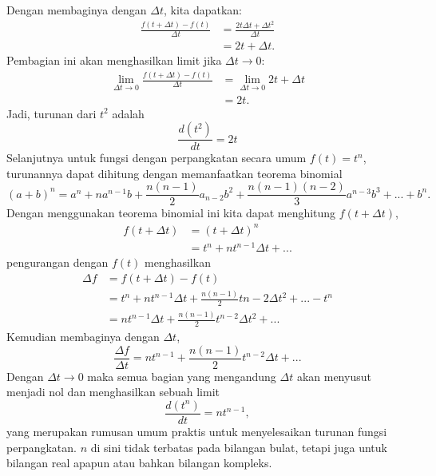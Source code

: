 Dengan membaginya dengan $\Delta t$, kita dapatkan:
\begin{align*}
\frac{f(t + \Delta t)-f(t)}{\Delta t}&=\frac{2t\Delta t + \Delta t^2}{\Delta t}\\
&=2t+\Delta t.
\end{align*}
Pembagian ini akan menghasilkan limit jika $\Delta t \rightarrow 0$:
\begin{align*}
\lim_{\Delta t\rightarrow 0}\frac{f(t+\Delta t)-f(t)}{\Delta t}&=\lim_{\Delta t \rightarrow 0} 2t + \Delta t\\
&= 2t.
\end{align*} 
Jadi, turunan dari $t^2$ adalah
\[
\frac{d(t^2)}{dt}=2t
\]
Selanjutnya untuk fungsi dengan perpangkatan secara umum $f(t)=t^n$, turunannya dapat dihitung dengan memanfaatkan teorema binomial
\[
(a+b)^n=a^n+na^{n-1}b+\frac{n(n-1)}{2}a_{n-2}b^2+\frac{n(n-1)(n-2)}{3}a^{n-3}b^3+...+b^n.
\] 
Dengan menggunakan teorema binomial ini kita dapat menghitung $f(t+\Delta t)$,
\begin{align*}
f(t+\Delta t)&=(t+\Delta t)^n\\
&=t^n+nt^{n-1}\Delta t+...
\end{align*}
pengurangan dengan $f(t)$ menghasilkan
\begin{align*}
\Delta f&= f(t+\Delta t)-f(t)\\
&= t^n+nt^{n-1}\Delta t+\frac{n(n-1)}{2}t{n-2}\Delta t^2+...-t^n\\
&=nt^{n-1}\Delta t+\frac{n(n-1)}{2}t^{n-2}\Delta t^2+...
\end{align*}
Kemudian membaginya dengan $\Delta t$,
\[
\frac{\Delta f}{\Delta t}=nt^{n-1}+\frac{n(n-1)}{2}t^{n-2}\Delta t+...
\]
Dengan $\Delta t \rightarrow 0$ maka semua bagian yang mengandung $\Delta t$ akan menyusut menjadi nol dan menghasilkan sebuah limit
\begin{equation}
\frac{d(t^n)}{dt}=nt^{n-1},
\end{equation}
yang merupakan rumusan umum praktis untuk menyelesaikan turunan fungsi perpangkatan. $n$ di sini tidak terbatas pada bilangan bulat, tetapi juga untuk bilangan real apapun atau bahkan bilangan kompleks.

